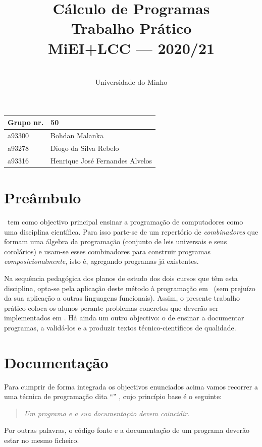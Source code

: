 \documentclass[a4paper]{article}
\title{
       	Cálculo de Programas
\\
       	Trabalho Prático
\\
       	MiEI+LCC --- 2020/21
}
\author{
       	\dium
\\
       	Universidade do Minho
}
\date\mydate
\begin{document}
\maketitle

\begin{center}\large
\begin{tabular}{ll}
\textbf{Grupo} nr. & 50
\\\hline
a93300 & Bohdan Malanka	
\\
a93278 & Diogo da Silva Rebelo
\\
a93316 & Henrique José Fernandes Alvelos
\end{tabular}
\end{center}

\section{Preâmbulo}

\CP\ tem como objectivo principal ensinar
a progra\-mação de computadores como uma disciplina científica. Para isso
parte-se de um repertório de \emph{combinadores} que formam uma álgebra da
programação (conjunto de leis universais e seus corolários) e usam-se esses
combinadores para construir programas \emph{composicionalmente}, isto é,
agregando programas já existentes.
  
Na sequência pedagógica dos planos de estudo dos dois cursos que têm
esta disciplina, opta-se pela aplicação deste método à programação
em \Haskell\ (sem prejuízo da sua aplicação a outras linguagens 
funcionais). Assim, o presente trabalho prático coloca os
alunos perante problemas concretos que deverão ser implementados em
\Haskell.  Há ainda um outro objectivo: o de ensinar a documentar
programas, a validá-los e a produzir textos técnico-científicos de
qualidade.

\section{Documentação} Para cumprir de forma integrada os objectivos
enunciados acima vamos recorrer a uma técnica de programa\-ção dita
``'' \cite{Kn92}, cujo princípio base é o seguinte:
%
\begin{quote}\em Um programa e a sua documentação devem coincidir.
\end{quote}
%
Por outras palavras, o código fonte e a documentação de um
programa deverão estar no mesmo ficheiro.
\end{document}
